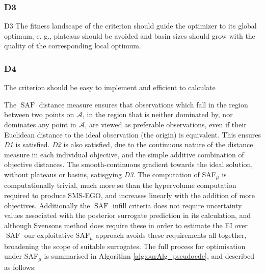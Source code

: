 \documentclass[conference]{IEEEtran}
\newcommand{\attainmentfront}{\mathcal{A}}
\DeclareMathOperator*{\saf}{SAF}
\newcommand\safmu{SAF$_{\mu}$\xspace}
\newcommand\smsego{SMS-EGO\xspace}
\newcommand\ei{EI\xspace}
\begin{document}
\subsubsection{D3}
D3 The fitness landscape of the criterion should guide the optimizer to its global optimum, e. g., plateaus should be avoided and basin sizes should grow with the quality of the corresponding local optimum.

\subsubsection{D4}
The criterion should be easy to implement and efficient to calculate

The $\saf$ distance measure ensures that observations which fall in the region between two points on $\attainmentfront$, in the region that is neither dominated by, nor dominates any point in $\attainmentfront$, are viewed as preferable observations, even if their Euclidean distance to the ideal observation (the origin) is equivalent. This ensures \textit{D1} is satisfied. \textit{D2} is also satisfied, due to the continuous nature of the distance measure in each individual objective, and the simple additive combination of objective distances. The smooth-continuous gradient towards the ideal solution, without plateaus or basins, satisgying \textit{D3}. The computation of \safmu is computationally trivial, much more so than the hypervolume computation required to produce \smsego, and increases linearly with the addition of more objectives. Additionally the $\saf$ infill criteria does not require uncertainty values associated with the posterior surrogate prediction in its calculation, and although Svensons \cite{svenson2016multiobjective} method does require these in order to estimate the \ei over $\saf$ our exploitative \safmu approach avoids these requirements all together, broadening the scope of suitable surrogates. The full process for optimisation under \safmu is summarised in Algorithm  \ref{alg:ourAlg_pseudocde}, and described as follows:
\end{document}
